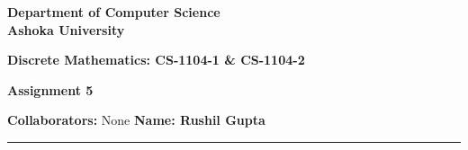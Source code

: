 \documentclass[a4paper]{article}
\begin{document}
\begin{center}
{\large \bf \color{red}  Department of Computer Science} \\
{\large \bf \color{red}  Ashoka University} \\

\vspace{0.1in}

{\large \bf \color{blue}  Discrete Mathematics: CS-1104-1 \& CS-1104-2}

\vspace{0.05in}

    { \bf \color{YellowOrange} Assignment 5}
\end{center}
\medskip

{\textbf{Collaborators:} None} \hfill {\textbf{Name: Rushil Gupta} }

\bigskip
\hrule
\end{document}
